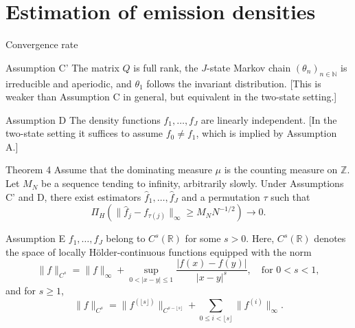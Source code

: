 \documentclass[10pt, aspectratio=169]{beamer}
\begin{document}
\section[Estimation of Emission Densities]{Estimation of emission densities}
\begin{frame}{Convergence rate}
   \begin{assumpbox}{Assumption C'}
        The matrix \( Q \) is full rank, the \( J \)-state Markov chain \( (\theta_n)_{n \in \mathbb{N}} \) is irreducible and aperiodic, and \( \theta_1 \) follows the invariant distribution. [This is weaker than Assumption C in general, but equivalent in the two-state setting.]
    \end{assumpbox}

    \begin{assumpbox}{Assumption D}
        The density functions \( f_1, \ldots, f_J \) are linearly independent. [In the two-state setting it suffices to assume \( f_0 \neq f_1 \), which is implied by Assumption A.]
    \end{assumpbox}
\end{frame}
\begin{frame}
   \begin{mytheorembox}{Theorem 4}
        Assume that the dominating measure \( \mu \) is the counting measure on \( \mathbb{Z} \). Let \( M_N \) be a sequence tending to infinity, arbitrarily slowly. Under Assumptions C' and D, there exist estimators \( \hat{f}_1, \ldots, \hat{f}_J \) and a permutation \( \tau \) such that
        \[
        \Pi_H \left( \| \hat{f}_j - f_{\tau(j)} \|_\infty \geq M_N N^{-1/2} \right) \to 0.
        \]
    \end{mytheorembox}
\end{frame}
\begin{frame}
   \begin{assumpbox}{Assumption E}
        \( f_1, \ldots, f_J \) belong to \( C^s(\mathbb{R}) \) for some \( s > 0 \). Here, \( C^s(\mathbb{R}) \) denotes the space of locally Hölder-continuous functions equipped with the norm
        \[
        \| f \|_{C^s} = \| f \|_\infty + \sup_{0 < |x - y| \leq 1} \frac{|f(x) - f(y)|}{|x - y|^s}, \quad \text{for } 0 < s < 1,
        \]
        and for \( s \geq 1 \),
        \[
        \| f \|_{C^s} = \| f^{(\lfloor s \rfloor)} \|_{C^{s - \lfloor s \rfloor}} + \sum_{0 \leq i < \lfloor s \rfloor} \| f^{(i)} \|_\infty.
        \]
    \end{assumpbox}
\end{frame}
\end{document}
